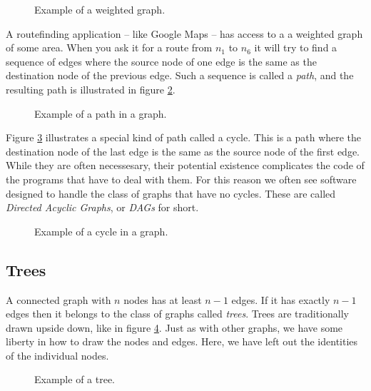 \begin{figure}[tbp]
  
  \caption{Example of a weighted graph.}
  \label{fig:bs:graphs:weighted}
\end{figure}

A routefinding application -- like Google Maps -- has access to a a weighted graph of some area. When you ask it for a route from $n_1$ to $n_6$ it will try to find a sequence of edges where the source node of one edge is the same as the destination node of the previous edge. Such a sequence is called a \textsl{path}, and the resulting path is illustrated in figure \ref{fig:bs:graphs:path}.

\begin{figure}[tbp]
  
  \caption{Example of a path in a graph.}
  \label{fig:bs:graphs:path}
\end{figure}

Figure \ref{fig:bs:graphs:cycle} illustrates a special kind of path called a cycle. This is a path where the destination node of the last edge is the same as the source node of the first edge. While they are often necessesary, their potential existence complicates the code of the programs that have to deal with them. For this reason we often see software designed to handle the class of graphs that have no cycles. These are called \textsl{Directed Acyclic Graphs}, or \textsl{DAGs} for short.

\begin{figure}[tbp]
  
  \caption{Example of a cycle in a graph.}
  \label{fig:bs:graphs:cycle}
\end{figure}


\subsection{Trees}

A connected graph with $n$ nodes has at least $n-1$ edges. If it has exactly $n-1$ edges then it belongs to the class of graphs called \textsl{trees}. Trees are traditionally drawn upside down, like in figure \ref{fig:bs:graphs:trees}. Just as with other graphs, we have some liberty in how to draw the nodes and edges. Here, we have left out the identities of the individual nodes.

\begin{figure}[tbp]
  
  \caption{Example of a tree.}
  \label{fig:bs:graphs:trees}
\end{figure}

